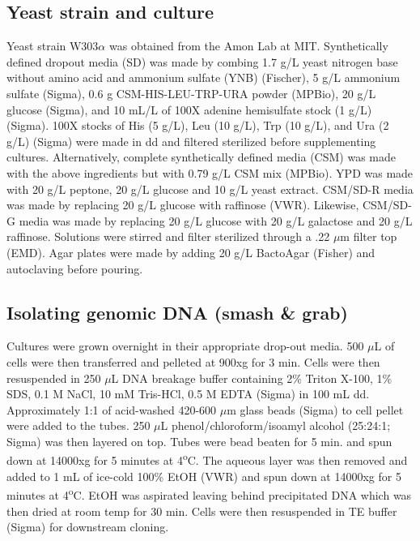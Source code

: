 \documentclass[../main/main]{subfiles}
\begin{document}
\subsection*{Yeast strain and culture}
Yeast strain W303$\alpha$ was obtained from the Amon Lab at MIT. Synthetically defined dropout media (SD) was made by combing 1.7 g/L yeast nitrogen base without amino acid and ammonium sulfate (YNB) (Fischer), 5 g/L ammonium sulfate (Sigma), 0.6 g CSM-HIS-LEU-TRP-URA powder (MPBio), 20 g/L glucose (Sigma), and 10 mL/L of 100X adenine hemisulfate stock (1 g/L) (Sigma). 100X stocks of His (5 g/L), Leu (10 g/L), Trp (10 g/L), and Ura (2 g/L) (Sigma) were made in dd and filtered sterilized before supplementing cultures. Alternatively, complete synthetically defined media (CSM) was made with the above ingredients but with 0.79 g/L CSM mix (MPBio). YPD was made with 20 g/L peptone, 20 g/L glucose and 10 g/L yeast extract. CSM/SD-R media was made by replacing 20 g/L glucose with raffinose (VWR). Likewise, CSM/SD-G media was made by replacing 20 g/L glucose with 20 g/L galactose and 20 g/L raffinose. Solutions were stirred and filter sterilized through a .22 $\mu$m filter top (EMD). Agar plates were made by adding 20 g/L BactoAgar (Fisher) and autoclaving before pouring.

\subsection*{Isolating genomic DNA (smash \& grab)}
Cultures were grown overnight in their appropriate drop-out media. 500 $\mu$L of cells were then transferred and pelleted at 900xg for 3 min. Cells were then resuspended in 250 $\mu$L DNA breakage buffer containing 2\% Triton X-100, 1\% SDS, 0.1 M NaCl, 10 mM Tris-HCl, 0.5 M EDTA (Sigma) in 100 mL dd. Approximately 1:1 of acid-washed 420-600 $\mu$m glass beads (Sigma) to cell pellet were added to the tubes. 250 $\mu$L phenol/chloroform/isoamyl alcohol (25:24:1; Sigma) was then layered on top. Tubes were bead beaten for 5 min. and spun down at 14000xg for 5 minutes at 4\textsuperscript{o}C. The aqueous layer was then removed and added to 1 mL of ice-cold 100\% EtOH (VWR) and spun down at 14000xg for 5 minutes at 4\textsuperscript{o}C. EtOH was aspirated leaving behind precipitated DNA which was then dried at room temp for 30 min. Cells were then resuspended in TE buffer (Sigma) for downstream cloning.
\end{document}

